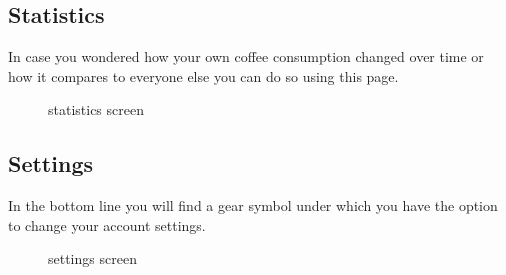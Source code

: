 \subsection{Statistics}\label{statistics-2}

In case you wondered how your own coffee consumption changed over time
or how it compares to everyone else you can do so using this page.

\begin{figure}[htbp]
\centering
{}
\caption{statistics screen}
\end{figure}

\subsection{Settings}\label{settings-2}

In the bottom line you will find a gear symbol under which you have the
option to change your account settings.

\begin{figure}[htbp]
\centering
{}
\caption{settings screen}
\end{figure}

